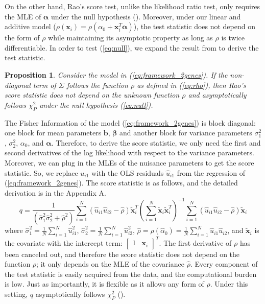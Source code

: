 \documentclass[aoas,authoryear, preprint]{imsart}
\numberwithin{equation}{section}
\theoremstyle{plain}
\newtheorem{prop}{Proposition}
\begin{document}
On the other hand, Rao's score test, unlike the likelihood ratio test, only requires the MLE of $\bm{\alpha}$ under the null hypothesis (\cite{rao1973linear}). Moreover, under our linear and additive model ($\rho(\bm{x}_i) = \rho(\alpha_0 + \bm{x}_i^T\bm{\alpha})$), the test statistic does not depend on the form of $\rho$ while maintaining its asymptotic property as long as $\rho$ is twice differentiable. In order to test (\ref{eq:null}), we expand the result from \cite{breusch1979simple} to derive the test statistic.\\ 

\begin{prop}
Consider the model in (\ref{eq:framework_2genes}). If the non-diagonal term of $\Sigma$ follows the function $\rho$ as defined in (\ref{eq:rho}), then Rao's score statistic does not depend on the unknown function $\rho$ and asymptotically follows $\chi_P^2$ under the null hypothesis (\ref{eq:null}).
\label{theorem:q}
\end{prop}


The Fisher Information of the model (\ref{eq:framework_2genes}) is block diagonal: one block for mean parameters $\bm{b}$, $\bm{\beta}$ and another block for variance parameters $\sigma_1^2$, $\sigma_2^2$, $\alpha_0$, and $\bm{\alpha}$. Therefore, to derive the score statistic, we only need the first and second derivatives of the log likelihood with respect to the variance parameters. Moreover, we can plug in the MLEs of the nuisance parameters to get the score statistic. So, we replace $u_{i1}$ with the OLS residuals $\hat{u}_{i1}$ from the regression of (\ref{eq:framework_2genes}). The score statistic is as follows, and the detailed derivation is in the Appendix A. 
\begin{equation}
    q = \frac{1}{(\hat{\sigma}_1^2\hat{\sigma}_2^2+\hat{\rho}^2)}\sum_{i=1}^{N} (\hat{u}_{i1}\hat{u}_{i2}-\hat{\rho})\bm{\tilde{x}}_i^T (\sum_{i=1}^{N}\bm{\tilde{x}}_i \bm{\tilde{x}}_i^T)^{-1}
    \sum_{i=1}^{N} (\hat{u}_{i1}\hat{u}_{i2}-\hat{\rho})\bm{\tilde{x}}_i
    \label{eq:q}
\end{equation}
where $\hat{\sigma}_1^2 = \frac{1}{N} \sum_{i=1}^{N} \hat{u}_{i1}^2$, $\hat{\sigma}_2^2  = \frac{1}{N} \sum_{i=1}^{N} \hat{u}_{i2}^2$, $\hat{\rho} = \rho(\hat{\alpha}_0) = \frac{1}{N} \sum_{i=1}^{N} \hat{u}_{i1}\hat{u}_{i2}$, and $\bm{\tilde{x}}_i$ is the covariate with the intercept term: $\begin{bmatrix} 1 & \bm{x}_i \end{bmatrix}^T$. The first derivative of $\rho$ has been canceled out, and therefore the score statistic does not depend on the function $\rho$; it only depends on the MLE of the covariance $\hat{\rho}$. Every component of the test statistic is easily acquired from the data, and the computational burden is low. Just as importantly, it is flexible as it allows any form of $\rho$. Under this setting, $q$ asymptotically follows $\chi_{P}^2$ (\cite{breusch1979simple}).\\
\end{document}
